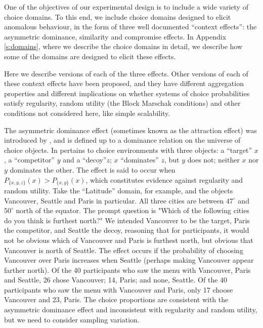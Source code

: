 \documentclass[11pt,letter]{article}
\newcommand{\bin}[2]{P_{\{#1,#2\}}(#1)}
\begin{document}
One of the objectives of our experimental design is to include a wide variety of choice domains.
To this end, we include choice domains designed to elicit anomalous behaviour, in the form of three well documented ``context effects'': the asymmetric dominance, similarity and compromise effects.
In Appendix \ref{s:domains}, where we describe the choice domains in detail, we describe how some of the domains are designed to elicit these effects.

Here we describe versions of each of the three effects.
Other versions of each of these context effects have been proposed, and they have different aggregation properties and different implications on whether systems of choice probabilities satisfy regularity, random utility (the Block Marschak conditions) and other conditions not considered here, like  simple scalability.

The asymmetric dominance effect (sometimes known as the attraction effect) was introduced by , and is defined up to a dominance relation on the universe of choice objects.
In pertains to choice environments with three objects: a ``target'' $x$, a ``competitor'' $y$ and a ``decoy''$z$; $x$ ``dominates'' $z$, but $y$ does not; neither $x$ nor $y$ dominates the other.
The effect is said to occur when $P_{\{x,y,z\}}(x) > \bin{x}{y}$, which constitutes evidence against regularity and random utility.
Take the ``Latitude'' domain, for example, and the objects Vancouver, Seattle and Paris in particular.
All three cities are between $47^\circ$ and $50^\circ$ north of the equator.
The prompt question is "Which of the following cities do you think is furthest north?"
We intended Vancouver to be the target, Paris the competitor, and Seattle the decoy, reasoning that for participants, it would not be obvious which of Vancouver and Paris is furthest north, but obvious that Vancouver is north of Seattle.
The effect occurs if the probability of choosing Vancouver over Paris increases when Seattle (perhaps making Vancouver appear farther north).
Of the 40 participants who saw the menu with Vancouver, Paris and Seattle, 26 chose Vancouver; 14, Paris; and none, Seattle.
Of the 40 participants who saw the menu with Vancouver and Paris, only 17 choose Vancouver and 23, Paris.
The choice proportions are consistent with the asymmetric dominance effect and inconsistent with regularity and random utility, but we need to consider sampling variation.
\end{document}
